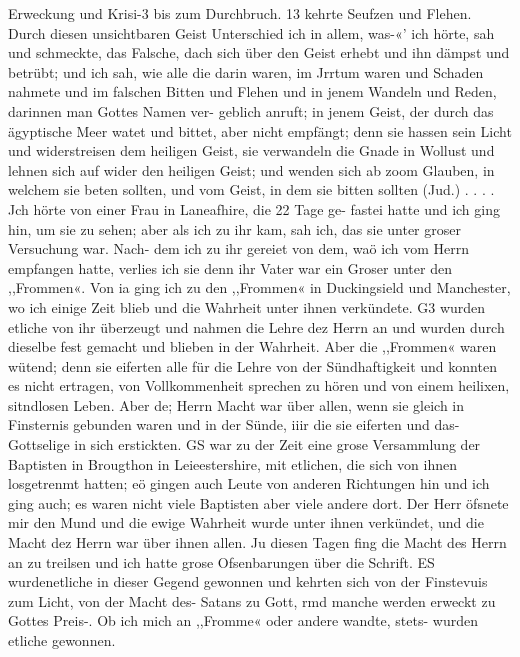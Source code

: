 Erweckung und Krisi-3 bis zum Durchbruch. 13
kehrte Seufzen und Flehen. Durch diesen unsichtbaren Geist
Unterschied ich in allem, was-«’ ich hörte, sah und schmeckte, das
Falsche, dach sich über den Geist erhebt und ihn dämpst und
betrübt; und ich sah, wie alle die darin waren, im Jrrtum waren
und Schaden nahmete und im falschen Bitten und Flehen und in
jenem Wandeln und Reden, darinnen man Gottes Namen ver-
geblich anruft; in jenem Geist, der durch das ägyptische Meer
watet und bittet, aber nicht empfängt; denn sie hassen sein
Licht und widerstreisen dem heiligen Geist, sie verwandeln die
Gnade in Wollust und lehnen sich auf wider den heiligen Geist;
und wenden sich ab zoom Glauben, in welchem sie beten sollten,
und vom Geist, in dem sie bitten sollten (Jud.) . . . .
Jch hörte von einer Frau in Laneafhire, die 22 Tage ge-
fastei hatte und ich ging hin, um sie zu sehen; aber als ich zu
ihr kam, sah ich, das sie unter groser Versuchung war. Nach-
dem ich zu ihr gereiet von dem, waö ich vom Herrn empfangen
hatte, verlies ich sie denn ihr Vater war ein Groser unter den
,,Frommen«. Von ia ging ich zu den ,,Frommen« in Duckingsield
und Manchester, wo ich einige Zeit blieb und die Wahrheit unter
ihnen verkündete. G3 wurden etliche von ihr überzeugt und nahmen
die Lehre dez Herrn an und wurden durch dieselbe fest gemacht und
blieben in der Wahrheit. Aber die ,,Frommen« waren wütend;
denn sie eiferten alle für die Lehre von der Sündhaftigkeit und
konnten es nicht ertragen, von Vollkommenheit sprechen zu hören
und von einem heilixen, sitndlosen Leben. Aber de; Herrn Macht
war über allen, wenn sie gleich in Finsternis gebunden waren
und in der Sünde, iiir die sie eiferten und das- Gottselige in sich
erstickten. GS war zu der Zeit eine grose Versammlung der
Baptisten in Brougthon in Leieestershire, mit etlichen, die sich
von ihnen losgetrenmt hatten; eö gingen auch Leute von anderen
Richtungen hin und ich ging auch; es waren nicht viele Baptisten
aber viele andere dort. Der Herr öfsnete mir den Mund und
die ewige Wahrheit wurde unter ihnen verkündet, und die Macht
dez Herrn war über ihnen allen. Ju diesen Tagen fing die Macht
des Herrn an zu treilsen und ich hatte grose Ofsenbarungen über die
Schrift. ES wurdenetliche in dieser Gegend gewonnen und kehrten
sich von der Finstevuis zum Licht, von der Macht des- Satans zu
Gott, rmd manche werden erweckt zu Gottes Preis-. Ob ich mich an
,,Fromme« oder andere wandte, stets- wurden etliche gewonnen.


